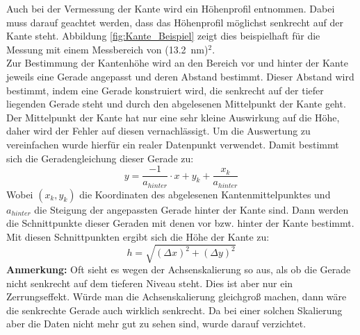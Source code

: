 \documentclass[12pt,a4paper]{article}
\begin{document}
Auch bei der Vermessung der Kante wird ein Höhenprofil entnommen. Dabei muss darauf geachtet werden, dass das Höhenprofil möglichst senkrecht auf der Kante steht. Abbildung \ref{fig:Kante_Beispiel} zeigt dies beispielhaft für die Messung mit einem Messbereich von (\SI{13,2}{nm})$^2$.\\
Zur Bestimmung der Kantenhöhe wird an den Bereich vor und hinter der Kante jeweils eine Gerade angepasst und deren Abstand bestimmt. Dieser Abstand wird bestimmt, indem eine Gerade konstruiert wird, die senkrecht auf der tiefer liegenden Gerade steht und durch den abgelesenen Mittelpunkt der Kante geht.
Der Mittelpunkt der Kante hat nur eine sehr kleine Auswirkung auf die Höhe, daher wird der Fehler auf diesen vernachlässigt. Um die Auswertung zu vereinfachen wurde hierfür ein realer Datenpunkt verwendet. Damit bestimmt sich die Geradengleichung dieser Gerade zu:
\begin{equation*}
y = \dfrac{-1}{a_{hinter}} \cdot x + y_k + \dfrac{x_k}{a_{hinter}}
\end{equation*}
Wobei $(x_k, y_k)$ die Koordinaten des abgelesenen Kantenmittelpunktes und $a_{hinter}$ die Steigung der angepassten Gerade hinter der Kante sind. Dann werden die Schnittpunkte dieser Geraden mit denen vor bzw. hinter der Kante bestimmt. Mit diesen Schnittpunkten ergibt sich die Höhe der Kante zu:
\begin{equation*}
h = \sqrt{(\Delta x)^2 + (\Delta y)^2}
\end{equation*}
\textbf{Anmerkung:} Oft sieht es wegen der Achsenskalierung so aus, als ob die Gerade nicht senkrecht auf dem tieferen Niveau steht. Dies ist aber nur ein Zerrungseffekt. Würde man die Achsenskalierung gleichgroß machen, dann wäre die senkrechte Gerade auch wirklich senkrecht. Da bei einer solchen Skalierung aber die Daten nicht mehr gut zu sehen sind, wurde darauf verzichtet.\\
\\
\end{document}
